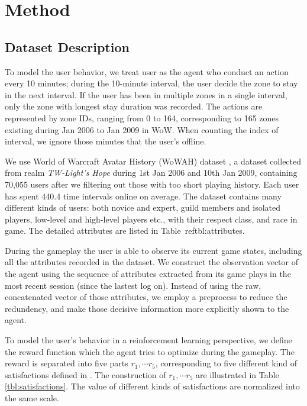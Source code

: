 \documentclass{sigchi}
\begin{document}
\section{Method}

\subsection{Dataset Description}

To model the user behavior, we treat user as the agent who conduct an action every 10 minutes; during the 10-minute interval, the user decide the zone to stay in the next interval. If the user has been in multiple zones in a single interval, only the zone with longest stay duration was recorded. The actions are represented by zone IDs, ranging from 0 to 164, corresponding to 165 zones existing during Jan 2006 to Jan 2009 in WoW. When counting the index of interval, we ignore those minutes that the user's offline.

We use World of Warcraft Avatar History (WoWAH) dataset \cite{lee2011world}, a dataset collected from realm \textit{TW-Light's Hope} during 1st Jan 2006 and 10th Jan 2009, containing 70,055 users after we filtering out those with too short playing history. Each user has spent 440.4 time intervals online on average. The dataset contains many different kinds of users: both novice and expert, guild members and isolated players, low-level and high-level players etc., with their respect class, and race in game. The detailed attributes are listed in Table~ref{tbl:attributes}.

During the gameplay the user is able to observe its current game states, including all the attributes recorded in the dataset. We construct the observation vector of the agent using the sequence of attributes extracted from its game plays in the most recent session (since the lastest log on). Instead of using the raw, concatenated vector of those attributes, we employ a preprocess to reduce the redundency, and make those decisive information more explicitly shown to the agent.

To model the user's behavior in a reinforcement learning perspective, we define the reward function which the agent tries to optimize during the gameplay. The reward is separated into five parts $r_1,\cdots r_5$, corresponding to five different kind of satisfactions defined in \cite{yee2006motivations}. The construction of $r_1,\cdots r_5$ are illustrated in Table \ref{tbl:satisfactions}. The value of different kinds of satisfactions are normalized into the same scale.
\end{document}
